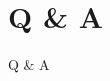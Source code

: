 \documentclass{beamer}
\begin{document}

\section{Q \& A}
\begin{frame}
  \Huge{\centerline{Q \& A}}
\end{frame}

\end{document}
